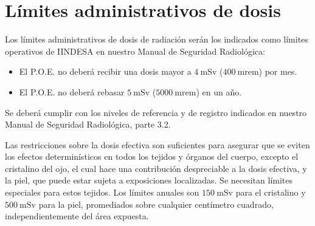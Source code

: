\section{Límites administrativos de dosis}

Los límites administrativos de dosis de radiación serán los indicados como límites operativos de IINDESA en nuestro Manual de Seguridad Radiológica:
\begin{itemize}
  \item El P.O.E. no deberá recibir una dosis mayor a $4\ \mathrm{mSv}$ ($400\ \mathrm{mrem}$) por mes.
  \item El P.O.E. no deberá rebasar $5\ \mathrm{mSv}$ ($5000\ \mathrm{mrem}$) en un año.
\end{itemize}

Se deberá cumplir con los niveles de referencia y de registro indicados en nuestro Manual de Seguridad Radiológica, parte 3.2.

Las restricciones sobre la dosis efectiva son suficientes para asegurar que se eviten los efectos determinísticos en todos los tejidos y órganos del cuerpo, excepto el cristalino del ojo, el cual hace una contribución despreciable a la dosis efectiva, y la piel, que puede estar sujeta a exposiciones localizadas. Se necesitan límites especiales para estos tejidos. Los límites anuales son $150\ \mathrm{mSv}$ para el cristalino y $500\ \mathrm{mSv}$ para la piel, promediados sobre cualquier centímetro cuadrado, independientemente del área expuesta.
